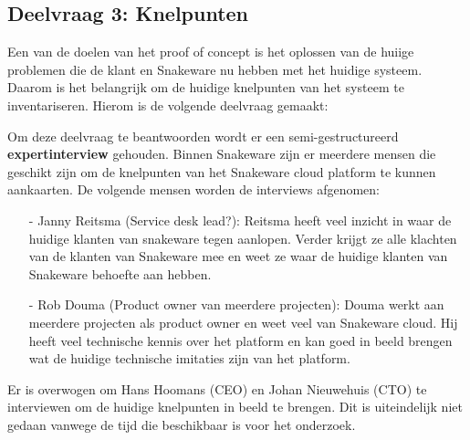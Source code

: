 \subsection{Deelvraag 3: Knelpunten}
Een van de doelen van het proof of concept is het oplossen van de huiige problemen die de klant en Snakeware nu hebben met het huidige systeem.
Daarom is het belangrijk om de huidige knelpunten van het systeem te inventariseren.
Hierom is de volgende deelvraag gemaakt:

%
%
\begin{center}
    \textit{\SubquestionThree}
\end{center}

\whitespace[0.2]
Om deze deelvraag te beantwoorden wordt er een semi-gestructureerd \textbf{expertinterview} gehouden.
Binnen Snakeware zijn er meerdere mensen die geschikt zijn om de knelpunten van het Snakeware cloud platform te kunnen aankaarten.
De volgende mensen worden de interviews afgenomen:
\begin{itemize}
    \item[-] Janny Reitsma (Service desk lead?): Reitsma heeft veel inzicht in waar de huidige klanten van snakeware tegen aanlopen.
        Verder krijgt ze alle klachten van de klanten van Snakeware mee en weet ze waar de huidige klanten van Snakeware behoefte aan hebben.
    \item[-] Rob Douma (Product owner van meerdere projecten): Douma werkt aan meerdere projecten als product owner en weet veel van Snakeware cloud.
        Hij heeft veel technische kennis over het platform en kan goed in beeld brengen wat de huidige technische imitaties zijn van het platform.
\end{itemize}

\whitespace
Er is overwogen om Hans Hoomans (CEO) en Johan Nieuwehuis (CTO) te interviewen om de huidige knelpunten in beeld te brengen.
Dit is uiteindelijk niet gedaan vanwege de tijd die beschikbaar is voor het onderzoek.
